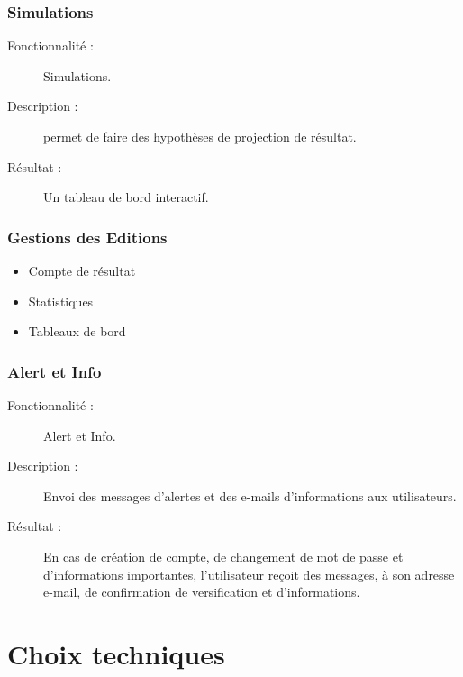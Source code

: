 \documentclass[12pt]{article}
\begin{document}
\subsubsection{ Simulations }
\begin{description}

\item[Fonctionnalité :] Simulations.

\item[Description :]  permet de faire des hypothèses de projection de résultat.

\item[Résultat :]  Un tableau de bord interactif.
\end{description}

\subsubsection{Gestions des Editions}
\begin{itemize}

\item Compte de résultat 
 
\item Statistiques

\item Tableaux de bord
\end{itemize}

\subsubsection{Alert et Info}
\begin{description}

\item[Fonctionnalité :] Alert et Info.

\item[Description :]  Envoi des messages d'alertes et des e-mails d'informations aux utilisateurs.

\item[Résultat :]  En cas de création de compte, de changement de mot de passe et d'informations importantes, 
l'utilisateur reçoit des messages, à son adresse e-mail, de confirmation de versification et d'informations.
\end{description}



\newpage 

\section{ Choix techniques}
\end{document}
